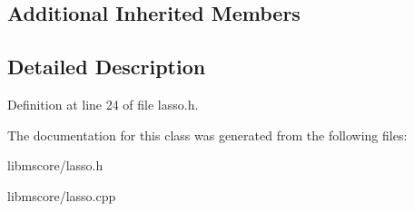 \subsection*{Additional Inherited Members}


\subsection{Detailed Description}


Definition at line 24 of file lasso.\+h.



The documentation for this class was generated from the following files\+:\begin{DoxyCompactItemize}
\item 
libmscore/lasso.\+h\item 
libmscore/lasso.\+cpp\end{DoxyCompactItemize}
